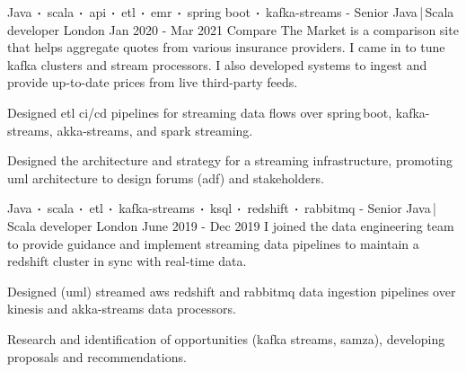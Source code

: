 \begin{cventries}
    \cventry
    {Java$\sqbig$scala$\sqbig$api$\sqbig$etl$\sqbig$emr$\sqbig$spring boot$\sqbig$kafka-streams}
    { - Senior Java\,|\,Scala developer}
    {London}
    {Jan 2020 - Mar 2021}
    {Compare The Market is a comparison site that helps aggregate quotes from various insurance providers. I came in to tune kafka clusters and stream processors. I also developed systems to ingest and provide up-to-date prices from live third-party feeds.}
    {
        \begin{cvitems}
            \item{Designed etl ci/cd pipelines for streaming data flows over spring\,boot, kafka-streams, akka-streams, and spark streaming.}
            \item{Designed the architecture and strategy for a streaming infrastructure, promoting uml architecture to design forums (adf) and stakeholders.}
        \end{cvitems}
    }

    \cventry
    {Java$\sqbig$scala$\sqbig$etl$\sqbig$kafka-streams$\sqbig$ksql$\sqbig$redshift$\sqbig$rabbitmq}
    { - Senior Java\,|\,Scala developer}
    {London}
    {June 2019 - Dec 2019}
    {I joined the data engineering team to provide guidance and implement streaming data pipelines to maintain a redshift cluster in sync with real-time data.}
    {
        \begin{cvitems}
            \item{Designed (uml) streamed aws redshift and rabbitmq data ingestion pipelines over kinesis and akka-streams data processors. }
            \item{Research and identification of opportunities (kafka streams, samza), developing proposals and recommendations.}
        \end{cvitems}
    }


\end{cventries}
